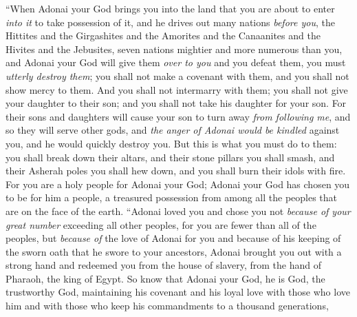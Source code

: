 \begin{biblechapter} %
\verse “When Adonai your God brings you into the land that you are about to enter \textit{into it} to take possession of it, and he drives out many nations \textit{before you}, the Hittites and the Girgashites and the Amorites and the Canaanites and the Hivites and the Jebusites, seven nations mightier and more numerous than you,
\verse and Adonai your God will give them \textit{over to you} and you defeat them, you must \textit{utterly destroy them}; you shall not make a covenant with them, and you shall not show mercy to them.
\verse And you shall not intermarry with them; you shall not give your daughter to their son; and you shall not take his daughter for your son.
\verse For their sons and daughters will cause your son to turn away \textit{from following me}, and so they will serve other gods, and \textit{the anger of Adonai would be kindled} against you, and he would quickly destroy you.
\verse But this is what you must do to them: you shall break down their altars, and their stone pillars you shall smash, and their Asherah poles you shall hew down, and you shall burn their idols with fire.
\verse For you are a holy people for Adonai your God; Adonai your God has chosen you to be for him a people, a treasured possession from among all the peoples that are on the face of the earth.
\verse “Adonai loved you and chose you not \textit{because of your great number} exceeding all other peoples, for you are fewer than all of the peoples,
\verse but \textit{because of} the love of Adonai for you and because of his keeping of the sworn oath that he swore to your ancestors, Adonai brought you out with a strong hand and redeemed you from the house of slavery, from the hand of Pharaoh, the king of Egypt.
\verse So know that Adonai your God, he is God, the trustworthy God, maintaining his covenant and his loyal love with those who love him and with those who keep his commandments to a thousand generations,

\end{biblechapter}
